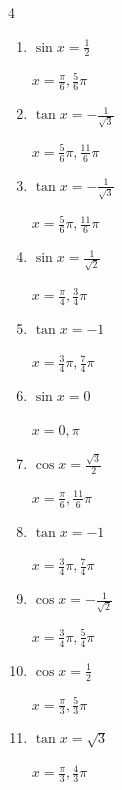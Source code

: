 \begin{multicols}{4}
\begin{enumerate}
  \item $\displaystyle \sin{x}  = \frac{1}{2}$

        $\displaystyle x = \frac{\pi}{6} , \frac{5}{6}\pi$

  \item $\displaystyle \tan{x}  = -\frac{1}{\sqrt{3}}$

        $\displaystyle x = \frac{5}{6}\pi , \frac{11}{6}\pi$

\columnbreak %

\resetques

  \item $\displaystyle \tan{x}  = -\frac{1}{\sqrt{3}}$

        $\displaystyle x = \frac{5}{6}\pi , \frac{11}{6}\pi$

  \item $\displaystyle \sin{x}  = \frac{1}{\sqrt{2}}$

        $\displaystyle x = \frac{\pi}{4} , \frac{3}{4}\pi$

  \item $\displaystyle \tan{x}  = -1$

        $\displaystyle x = \frac{3}{4}\pi , \frac{7}{4}\pi$

  \item $\displaystyle \sin{x}  = 0$

        $\displaystyle x = 0 , \pi$

  \item $\displaystyle \cos{x}  = \frac{\sqrt{3}}{2}$

        $\displaystyle x = \frac{\pi}{6} , \frac{11}{6}\pi$

  \item $\displaystyle \tan{x}  = -1$

        $\displaystyle x = \frac{3}{4}\pi , \frac{7}{4}\pi$

  \item $\displaystyle \cos{x}  = -\frac{1}{\sqrt{2}}$

        $\displaystyle x = \frac{3}{4}\pi , \frac{5}{4}\pi$

  \item $\displaystyle \cos{x}  = \frac{1}{2}$

        $\displaystyle x = \frac{\pi}{3} , \frac{5}{3}\pi$

  \item $\displaystyle \tan{x}  = \sqrt{3}$

        $\displaystyle x = \frac{\pi}{3} , \frac{4}{3}\pi$


\end{enumerate}
\end{multicols}
